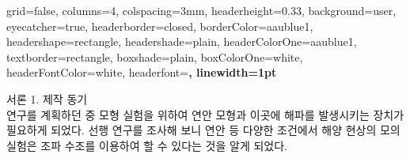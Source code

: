 \documentclass[Junlampaper, portrait]{Julam_PosterK}
\begin{document}
\begin{poster}{
  grid=false,
  columns=4,
  colspacing=3mm,
  headerheight=0.33\textheight,
  background=user,
  eyecatcher=true,
  headerborder=closed,
  borderColor=aaublue1,
  headershape=rectangle,
  headershade=plain,
  headerColorOne=aaublue1,
  textborder=rectangle,
  boxshade=plain,
  boxColorOne=white,
  headerFontColor=white,
  headerfont=\Large\sf\bf,
  linewidth=1pt
}

{
}
{
}



\begin{posterbox}[name=intro,column=0]{서론}
    \small {1. 제작 동기 \\}
        \scriptsize {연구를 계획하던 중 모형 실험을 위하여 연안 모형과 이곳에 해파를 발생시키는 장치가 필요하게 되었다. 선행 연구를 조사해 보니 연안 등 다양한 조건에서 해양 현상의 모의 실험은 조파 수조를 이용하여 할 수 있다는 것을 알게 되었다\cite{chung2013}.\\}


\end{posterbox}
\end{poster}
\end{document}
